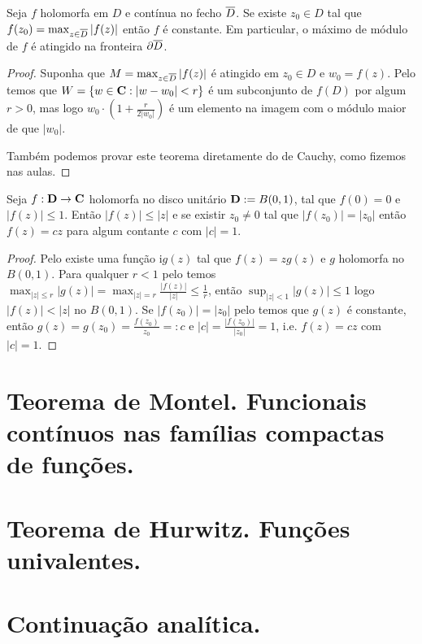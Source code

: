 \begin{teorema}
\label{t:maximo}
Seja $f$ holomorfa em $D$ e contínua no fecho $\overline{D}$.
Se existe $z_0\in D$ tal que $f(z_0) = \max_{z\in\overline{D}} |f(z)|$ então $f$ é constante.
Em particular, o máximo de módulo de $f$ é atingido na fronteira $\partial\overline{D}$.
\end{teorema}
\begin{proof}
Suponha que $M = \max_{z\in\overline{D}} |f(z)|$ é atingido em $z_0\in D$ e $w_0 = f(z)$.
Pelo  temos que $W = \{ w\in\mathbf{C} : |w-w_0|<r \}$
é um subconjunto de $f(D)$ por algum $r>0$, mas logo
$w_0 \cdot (1+\frac{r}{2|w_0|})$ é um elemento na imagem com o módulo maior
de que $|w_0|$.

Também podemos provar este teorema diretamente do  de Cauchy,
como fizemos nas aulas.
\end{proof}

\begin{lema}[Schwartz]
Seja $f : \mathbf{D} \to \mathbf{C}$ holomorfa no disco unitário $\mathbf{D} := B(0,1)$,
tal que $f(0) = 0$ e $|f(z)| \leq 1$. Então $|f(z)|\leq|z|$
e se existir $z_0\neq 0$ tal que $|f(z_0)| = |z_0|$ então $f(z) = c z$ para algum contante $c$ com
$|c|=1$.
\end{lema}
\begin{proof}
Pelo  existe uma função i$g(z)$ tal que $f(z) = z g(z)$ e $g$ holomorfa no $B(0,1)$.
Para qualquer $r<1$ pelo  temos
$\max_{|z|\leq r} |g(z)| = \max_{|z|=r} \frac{|f(z)|}{|z|} \leq \frac1{r}$,
então $\sup_{|z|<1} |g(z)|\leq 1$ logo $|f(z)|<|z|$ no $B(0,1)$.
Se $|f(z_0)| = |z_0|$ pelo  temos que $g(z)$ é constante,
então $g(z) = g(z_0) = \frac{f(z_0)}{z_0} =:c$ e $|c| = \frac{|f(z_0)|}{|z_0|} = 1$,
i.e. $f(z) = c z$ com $|c|=1$.
\end{proof}

\section{Teorema de Montel. Funcionais contínuos nas famílias compactas de funções.}

\section{Teorema de Hurwitz. Funções univalentes.}

\section{Continuação analítica.}

